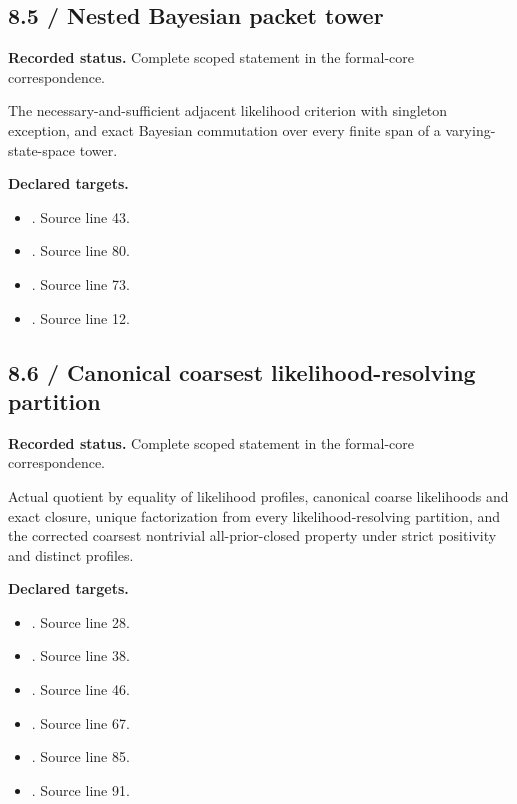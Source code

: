 \subsection{8.5 / Nested Bayesian packet tower}
\label{result:8.5}
\textbf{Recorded status.} Complete scoped statement in the formal-core correspondence.\par
The necessary-and-sufficient adjacent likelihood criterion with singleton exception, and exact Bayesian commutation over every finite span of a varying-state-space tower.

\textbf{Declared targets.}\begin{itemize}
\item {}. Source line 43.
\item {}. Source line 80.
\item {}. Source line 73.
\item {}. Source line 12.
\end{itemize}
\subsection{8.6 / Canonical coarsest likelihood-resolving partition}
\label{result:8.6}
\textbf{Recorded status.} Complete scoped statement in the formal-core correspondence.\par
Actual quotient by equality of likelihood profiles, canonical coarse likelihoods and exact closure, unique factorization from every likelihood-resolving partition, and the corrected coarsest nontrivial all-prior-closed property under strict positivity and distinct profiles.

\textbf{Declared targets.}\begin{itemize}
\item {}. Source line 28.
\item {}. Source line 38.
\item {}. Source line 46.
\item {}. Source line 67.
\item {}. Source line 85.
\item {}. Source line 91.
\end{itemize}
